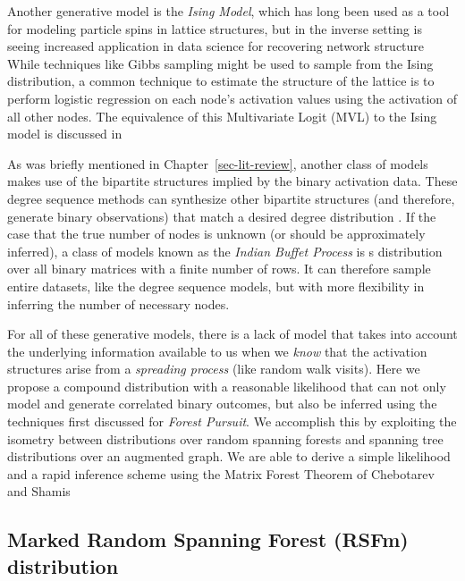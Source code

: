 \documentclass[%
	12pt,
		oneside,
		letterpaper
]{book}
\begin{document}
Another generative model is the \emph{Ising Model}, which has long been
used as a tool for modeling particle spins in lattice structures, but in
the inverse setting is seeing increased application in data science for
recovering network structure
\autocite{Inversestatisticalproblems_Nguyen2017} While techniques like
Gibbs sampling might be used to sample from the Ising distribution, a
common technique to estimate the structure of the lattice is to perform
logistic regression on each node's activation values using the
activation of all other nodes. The equivalence of this Multivariate
Logit (MVL) to the Ising model is discussed in
\textcite{Assortmentoptimizationgiven_Vasilyev2025}

As was briefly mentioned in Chapter~\ref{sec-lit-review}, another class
of models makes use of the bipartite structures implied by the binary
activation data. These degree sequence methods can synthesize other
bipartite structures (and therefore, generate binary observations) that
match a desired degree distribution
\autocite{fastballfastalgorithm_Godard2022,Randomlysamplingbipartite_Neal2023}.
If the case that the true number of nodes is unknown (or should be
approximately inferred), a class of models known as the \emph{Indian
Buffet Process} \autocite{IndianBuffetProcess_Griffiths2011} is s
distribution over all binary matrices with a finite number of rows. It
can therefore sample entire datasets, like the degree sequence models,
but with more flexibility in inferring the number of necessary nodes.

For all of these generative models, there is a lack of model that takes
into account the underlying information available to us when we
\emph{know} that the activation structures arise from a \emph{spreading
process} (like random walk visits). Here we propose a compound
distribution with a reasonable likelihood that can not only model and
generate correlated binary outcomes, but also be inferred using the
techniques first discussed for \emph{Forest Pursuit}. We accomplish this
by exploiting the isometry between distributions over random spanning
forests and spanning tree distributions over an augmented graph. We are
able to derive a simple likelihood and a rapid inference scheme using
the Matrix Forest Theorem of Chebotarev and Shamis
\autocite{MatrixForestTheorem_Chebotarev2006}

\subsection{Marked Random Spanning Forest (RSFm)
distribution}\label{marked-random-spanning-forest-rsfm-distribution}
\end{document}
